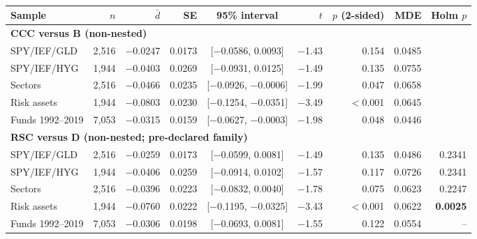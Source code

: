 \begin{table}[t]
\centering{}\scriptsize\setlength{\tabcolsep}{5pt}
\caption{}\label{tab:ladder-margin}
\begin{tabular}{lrrrcrrrr}
\toprule
Sample & $n$ & $\bar d$ & SE & 95\% interval & $t$ & $p$ (2-sided) & MDE & Holm $p$ \\
\midrule
\multicolumn{8}{l}{\textbf{CCC versus B (non-nested)}}\\
SPY/IEF/GLD & 2,516 & $-$0.0247 & 0.0173 & [$-$0.0586, 0.0093] & $-$1.43 & 0.154 & 0.0485 \\
SPY/IEF/HYG & 1,944 & $-$0.0403 & 0.0269 & [$-$0.0931, 0.0125] & $-$1.49 & 0.135 & 0.0755 \\
Sectors & 2,516 & $-$0.0466 & 0.0235 & [$-$0.0926, $-$0.0006] & $-$1.99 & 0.047 & 0.0658 \\
Risk assets & 1,944 & $-$0.0803 & 0.0230 & [$-$0.1254, $-$0.0351] & $-$3.49 & $<$0.001 & 0.0645 \\
Funds 1992--2019 & 7,053 & $-$0.0315 & 0.0159 & [$-$0.0627, $-$0.0003] & $-$1.98 & 0.048 & 0.0446 \\
\midrule
\multicolumn{9}{l}{\textbf{RSC versus D (non-nested; pre-declared family)}}\\
SPY/IEF/GLD & 2,516 & $-$0.0259 & 0.0173 & [$-$0.0599, 0.0081] & $-$1.49 & 0.135 & 0.0486 & 0.2341 \\
SPY/IEF/HYG & 1,944 & $-$0.0406 & 0.0259 & [$-$0.0914, 0.0102] & $-$1.57 & 0.117 & 0.0726 & 0.2341 \\
Sectors & 2,516 & $-$0.0396 & 0.0223 & [$-$0.0832, 0.0040] & $-$1.78 & 0.075 & 0.0623 & 0.2247 \\
Risk assets & 1,944 & $-$0.0760 & 0.0222 & [$-$0.1195, $-$0.0325] & $-$3.43 & $<$0.001 & 0.0622 & \textbf{0.0025} \\
Funds 1992--2019 & 7,053 & $-$0.0306 & 0.0198 & [$-$0.0693, 0.0081] & $-$1.55 & 0.122 & 0.0554 & -- \\
\bottomrule
\end{tabular}
\end{table}
